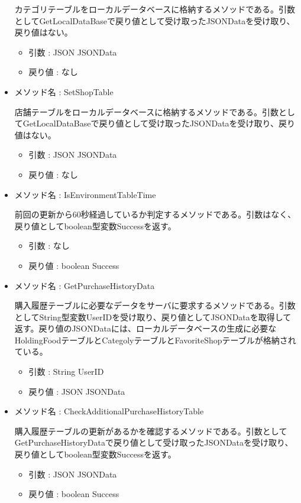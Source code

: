 \documentclass[a4j]{jarticle}
\begin{document}
\begin{itemize}
	カテゴリテーブルをローカルデータベースに格納するメソッドである。引数としてGetLocalDataBaseで戻り値として受け取ったJSONDataを受け取り、戻り値はない。
	\begin{itemize}
		\item 引数 : JSON JSONData
		\item 戻り値 : なし
	\end{itemize}

	\item メソッド名 : SetShopTable

	店舗テーブルをローカルデータベースに格納するメソッドである。引数としてGetLocalDataBaseで戻り値として受け取ったJSONDataを受け取り、戻り値はない。
	\begin{itemize}
		\item 引数 : JSON JSONData
		\item 戻り値 : なし
	\end{itemize}

    \item メソッド名 : IsEnvironmentTableTime

	前回の更新から60秒経過しているか判定するメソッドである。引数はなく、戻り値としてboolean型変数Successを返す。
	\begin{itemize}
		\item 引数 : なし
		\item 戻り値 : boolean Success
	\end{itemize}

    \item メソッド名 : GetPurchaseHistoryData

	購入履歴テーブルに必要なデータをサーバに要求するメソッドである。引数としてString型変数UserIDを受け取り、戻り値としてJSONDataを取得して返す。戻り値のJSONDataには、ローカルデータベースの生成に必要なHoldingFoodテーブルとCategolyテーブルとFavoriteShopテーブルが格納されている。
    \begin{itemize}
		\item 引数 : String UserID
		\item 戻り値 : JSON JSONData
	\end{itemize}

    \item メソッド名 : CheckAdditionalPurchaseHistoryTable

	購入履歴テーブルの更新があるかを確認するメソッドである。引数としてGetPurchaseHistoryDataで戻り値として受け取ったJSONDataを受け取り、戻り値としてboolean型変数Successを返す。
	\begin{itemize}
		\item 引数 : JSON JSONData
		\item 戻り値 : boolean Success
	\end{itemize}


\end{itemize}
\end{document}
